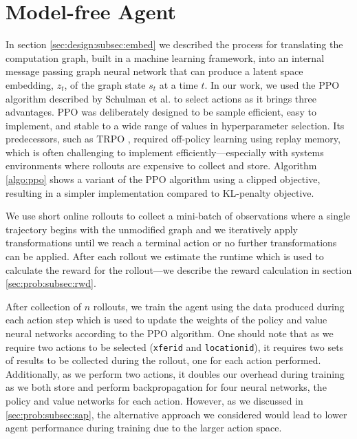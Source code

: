 \section{Model-free Agent}

In section \ref{sec:design:subsec:embed} we described the process for translating the computation graph, built in a machine learning framework, into an internal message passing graph neural network that can produce a latent space embedding, $z_t$, of the graph state $s_t$ at a time $t$. In our work, we used the PPO algorithm  described by Schulman et al. \cite{schulman2017proximal} to select actions as it brings three advantages. PPO was deliberately designed to be sample efficient, easy to implement, and stable to a wide range of values in hyperparameter selection. Its predecessors, such as TRPO \cite{schulman2017trust}, required off-policy learning using replay memory, which is often challenging to implement efficiently---especially with systems environments where rollouts are expensive to collect and store. Algorithm \ref{algo:ppo} shows a variant of the PPO algorithm using a clipped objective, resulting in a simpler implementation compared to KL-penalty objective.





We use short online rollouts to collect a mini-batch of observations where a single trajectory begins with the unmodified graph and we iteratively apply transformations until we reach a terminal action or no further transformations can be applied. After each rollout we estimate the runtime which is used to calculate the reward for the rollout---we describe the reward calculation in section \ref{sec:prob:subsec:rwd}.

After collection of $n$ rollouts, we train the agent using the data produced during each action step which is used to update the weights of the policy and value neural networks according to the PPO algorithm. One should note that as we require two actions to be selected (\texttt{xfer\textunderscore id} and \texttt{location\textunderscore id}), it requires two sets of results to be collected during the rollout, one for each action performed. Additionally, as we perform two actions, it doubles our overhead during training as we both store and perform backpropagation for four neural networks, the policy and value networks for each action. However, as we discussed in \ref{sec:prob:subsec:sap}, the alternative approach we considered would lead to lower agent performance during training due to the larger action space.